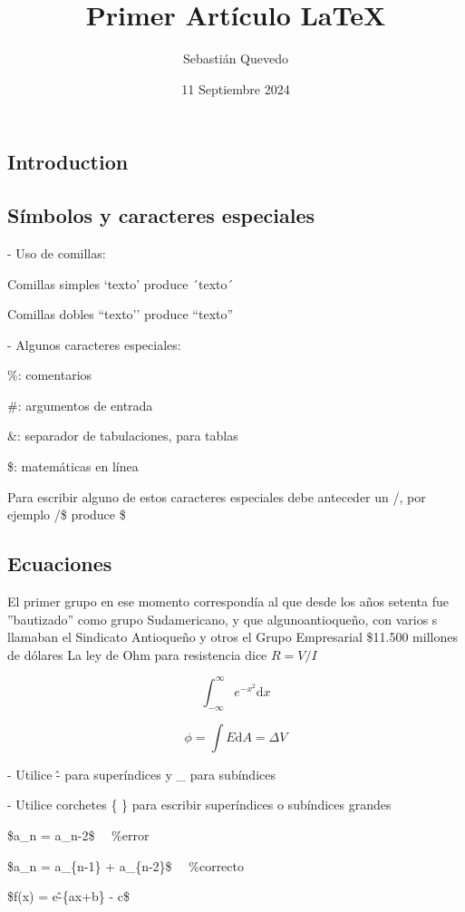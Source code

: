 \documentclass{article}
\title{Primer Artículo LaTeX}
\author{Sebastián Quevedo}
\date{11 Septiembre 2024}
\begin{document}
\maketitle

\begin{multicols}{2}

\section{Introduction}
\subsection{Símbolos y caracteres especiales}

- Uso de comillas:

\noindent Comillas simples `texto’ produce ´texto´

\noindent Comillas dobles ``texto’’ produce “texto”


\noindent - Algunos caracteres especiales:

\noindent \%: comentarios

\noindent \#: argumentos de entrada

\noindent \&: separador de tabulaciones, para tablas

\noindent \$: matemáticas en línea

\noindent Para escribir alguno de estos caracteres especiales debe anteceder un /, por ejemplo /\$ produce \$

\columnbreak

\subsection{Ecuaciones}
El primer grupo en ese momento correspondía al que desde los años setenta fue ''bautizado'' como grupo Sudamericano, y que algunoantioqueño, con varios s llamaban el Sindicato Antioqueño y otros el Grupo Empresarial \$11.500 millones de dólares La ley de Ohm para resistencia dice $R=V/I$

\begin{equation}
     \int_{-\infty}^\infty e^{-x^2} \mathrm{d}x
\end{equation}

\begin{equation}
    \phi = \int E \mathrm{d}A = \Delta V
\end{equation}

\noindent - Utilice \^- para superíndices y \_ para subíndices

\noindent - Utilice corchetes \{ \} para escribir superíndices o subíndices grandes

\noindent \$a\_n = a\_n-2\$  \ \    \%error

\noindent \$a\_n = a\_\{n-1\} + a\_\{n-2\}\$  \ \  \%correcto

\noindent \$f(x) = e\^-\{ax+b\} - c\$

\end{multicols}
\end{document}
